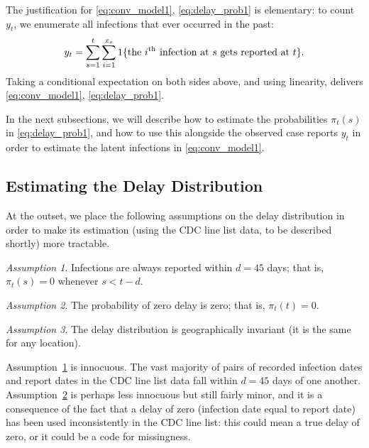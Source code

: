 \documentclass[sts]{imsart}
\def\th{^\mathrm{th}}
\theoremstyle{plain}
\theoremstyle{definition}
\theoremstyle{remark}
\newtheorem{assumption}{Assumption}
\begin{document}
The justification for \eqref{eq:conv_model1}, \eqref{eq:delay_prob1} is
elementary: to count $y_t$, we enumerate all infections that ever occurred in
the past:  
\[
y_t = \sum_{s=1}^t \sum_{i=1}^{x_s} 1\{\text{the $i\th$ \hspace{-3pt} infection   
  at $s$ gets reported at $t$}\}.
\]
Taking a conditional expectation on both sides above, and using linearity,
delivers \eqref{eq:conv_model1}, \eqref{eq:delay_prob1}.

In the next subsections, we will describe how to estimate the probabilities
$\pi_t(s)$ in \eqref{eq:delay_prob1}, and how to use this alongside the observed
case reports $y_t$ in order to estimate the latent infections in
\eqref{eq:conv_model1}. 

\subsection{Estimating the Delay Distribution} 
\label{sec:delay_distribution}

At the outset, we place the following assumptions on the delay distribution in 
order to make its estimation (using the CDC line list data, to be described
shortly) more tractable.   

\begin{assumption}
\label{asm:delay_support} 
Infections are always reported within $d=45$ days; that is, $\pi_t(s) = 0$
whenever $s < t-d$. 
\end{assumption}

\begin{assumption}
\label{asm:zero_at_zero}
The probability of zero delay is zero; that is, $\pi_t(t) = 0$.
\end{assumption}

\begin{assumption}
\label{asm:geo_invar}
The delay distribution is geographically invariant (it is the same for any
location). 
\end{assumption}

Assumption~\ref{asm:delay_support} is innocuous. The vast majority of pairs of
recorded infection dates and report dates in the CDC line list data fall within
$d=45$ days of one another. Assumption~\ref{asm:zero_at_zero} is perhaps less
innocuous but still fairly minor, and it is a consequence of the fact that a
delay of zero (infection date equal to report date) has been used inconsistently
in the CDC line list: this could mean a true delay of zero, or it could be a
code for missingness.
\end{document}
